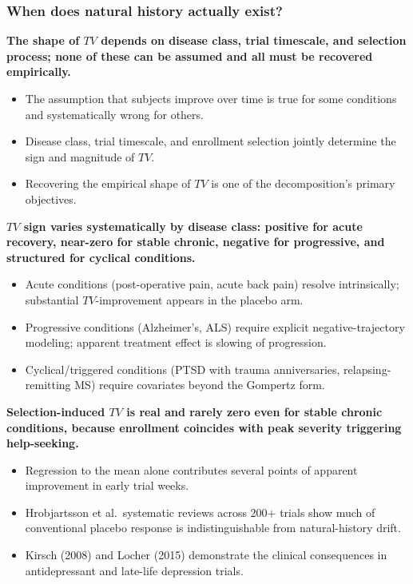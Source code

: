\documentclass[
  11pt,
]{article}
\newcounter{none} %
\begin{document}
\subsubsection{When does natural history actually exist?}\label{when-does-natural-history-actually-exist}

\textbf{The shape of $TV$ depends on disease class, trial timescale, and selection process; none of these can be assumed and all must be recovered empirically.}

\begin{itemize}\setlength{\itemsep}{2pt}\setlength{\parskip}{0pt}
\item The assumption that subjects improve over time is true for some conditions and systematically wrong for others.
\item Disease class, trial timescale, and enrollment selection jointly determine the sign and magnitude of $TV$.
\item Recovering the empirical shape of $TV$ is one of the decomposition's primary objectives.
\end{itemize}

\textbf{$TV$ sign varies systematically by disease class: positive for acute recovery, near-zero for stable chronic, negative for progressive, and structured for cyclical conditions.}

\begin{itemize}\setlength{\itemsep}{2pt}\setlength{\parskip}{0pt}
\item Acute conditions (post-operative pain, acute back pain) resolve intrinsically; substantial $TV$-improvement appears in the placebo arm.
\item Progressive conditions (Alzheimer's, ALS) require explicit negative-trajectory modeling; apparent treatment effect is slowing of progression.
\item Cyclical/triggered conditions (PTSD with trauma anniversaries, relapsing-remitting MS) require covariates beyond the Gompertz form.
\end{itemize}

\textbf{Selection-induced $TV$ is real and rarely zero even for stable chronic conditions, because enrollment coincides with peak severity triggering help-seeking.}

\begin{itemize}\setlength{\itemsep}{2pt}\setlength{\parskip}{0pt}
\item Regression to the mean alone contributes several points of apparent improvement in early trial weeks.
\item Hrobjartsson et al.\ systematic reviews across 200+ trials show much of conventional placebo response is indistinguishable from natural-history drift.
\item Kirsch (2008) and Locher (2015) demonstrate the clinical consequences in antidepressant and late-life depression trials.
\end{itemize}
\end{document}
